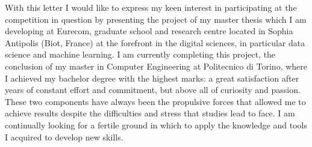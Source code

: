 \documentclass[11pt, a4paper]{awesome-cv}
\begin{document}
\makecvheader[L]


\makelettertitle

\begin{cvletter}

  
With this letter I would like to express my keen interest in participating at the competition in question by presenting the project of my master thesis which I am developing at Eurecom, graduate school and research centre located in Sophia Antipolis (Biot, France) at the forefront in the digital sciences, in particular data science and machine learning. 
I am currently completing this project, the conclusion of my master in Computer Engineering at Politecnico di Torino, where I achieved my bachelor degree with the highest marks: a great satisfaction after years of constant effort and commitment, but above all of curiosity and passion.
These two components have always been the propulsive forces that allowed me to achieve results despite the difficulties and stress that studies lead to face. I am continually looking for a fertile ground in which to apply the knowledge and tools I acquired to develop new skills.
  

\end{cvletter}
\end{document}
